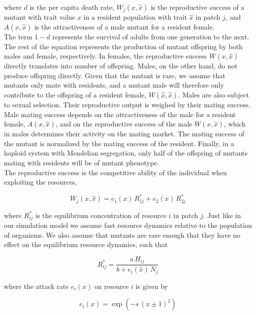 where $d$ is the per capita death rate, $W_j(x,\hat{x})$ is the reproductive success of a mutant with trait value $x$ in a resident population with trait $\hat{x}$ in patch $j$, and $A(x, \hat{x})$ is the attractiveness of a male mutant for a resident female.\\

The term $1-d$ represents the survival of adults from one generation to the next. The rest of the equation represents the production of mutant offspring by both males and female, respectively. In females, the reproductive success $W(x, \hat{x})$ directly translates into number of offspring. Males, on the other hand, do not produce offspring directly. Given that the mutant is rare, we assume that mutants only mate with residents, and a mutant male will therefore only contribute to the offspring of a resident female, $W(\hat{x}, \hat{x})$. Males are also subject to sexual selection. Their reproductive output is weighed by their mating success. Male mating success depends on the attractiveness of the male for a resident female, $A(x, \hat{x})$, and on the reproductive success of the male $W(x, \hat{x})$, which in males determines their activity on the mating market. The mating success of the mutant is normalized by the mating success of the resident. Finally, in a haploid system with Mendelian segregation, only half of the offspring of mutants mating with residents will be of mutant phenotype.\\

The reproductive success is the competitive ability of the individual when exploiting the resources,

\begin{equation}
    W_j(x, \hat{x}) = e_1(x) \, R^*_{1j} + e_2(x) \, R^*_{2j}
\end{equation}

where $R^*_{ij}$ is the equilibrium concentration of resource $i$ in patch $j$. Just like in our simulation model we assume fast resource dynamics relative to the population of organisms. We also assume that mutants are rare enough that they have no effect on the equilibrium resource dynamics, such that

\begin{equation}
    R^*_{ij} = \frac{a \, H_{ij}}{b + e_i(\hat{x})\,N_j}
\end{equation}

where the attack rate $e_i(x)$ on resource $i$ is given by

\begin{equation}
    e_i(x) = \exp{(-s\,(x \pm 1)^2)}
\end{equation}

